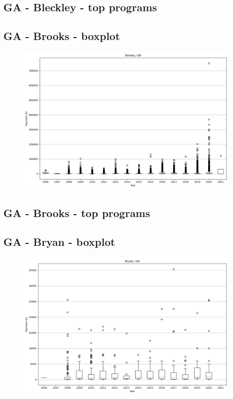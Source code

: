 \subsection*{GA - Bleckley - top programs}

\newpage
\subsection*{GA - Brooks - boxplot}
\begin{figure}[h]
\centering
\includegraphics[width=7in]{../output/boxplots/counties/Brooks-GA_boxplot.png}
\end{figure}


\subsection*{GA - Brooks - top programs}

\newpage
\subsection*{GA - Bryan - boxplot}
\begin{figure}[h]
\centering
\includegraphics[width=7in]{../output/boxplots/counties/Bryan-GA_boxplot.png}
\end{figure}


